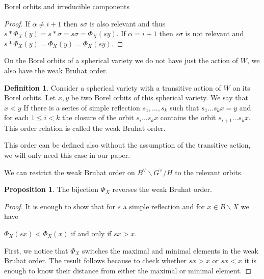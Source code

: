 \documentclass[12pt]{article}
\newcommand{\<}{\langle}
\renewcommand{\>}{\rangle}
\theoremstyle{plain}
\theoremstyle{definition}
\newtheorem{prop}[theorem]{Proposition}
\newtheorem{defn}[theorem]{Definition}
\begin{document}
\begin{section}{Borel orbits and irreducible components}
\begin{proof}
If $\alpha\neq i+1$ then $s\sigma$ is also relevant and thus $s*\Phi_X(y)=s*\sigma=s\sigma=\Phi_X(sy)$. If $\alpha=i+1$ then $s\sigma$ is not relevant and $s*\Phi_X(y)=\Phi_X(y)=\Phi_X(sy)$. 
\end{proof}

On the Borel orbits of a spherical variety we do not have just the action of $W$, we also have the weak Bruhat order. 

\begin{defn}
    Consider a spherical variety with a transitive action of $W$ on its Borel orbits.
    Let $x,y$ be two Borel orbits of this spherical variety. We say that $x<y$ If there is a series of simple reflection $s_1,...,s_k$ such that $s_1...s_kx=y$ and for each $1\leq i< k$ the closure of the orbit $s_i...s_kx$ contains the orbit $s_{i+1}...s_kx$. This order relation is called the weak Bruhat order.

    This order can be defined also without the assumption of the transitive action, we will only need this case in our paper.
\end{defn}


We can restrict the weak Bruhat order on $B^\vee\backslash G^\vee/H$ to the relevant orbits.

\begin{prop}\label{reverse order}
    The bijection $\Phi_X$ reverses the weak Bruhat order. 
\end{prop}

\begin{proof}

It is enough to show that for $s$ a simple reflection and for $x\in B\backslash X$ we have

$\Phi_X(sx)<\Phi_X(x)$ if and only if $sx>x$.

First, we notice that $\Phi_X$ switches the maximal and minimal elements in the weak Bruhat order. The result follows because to check whether $sx>x$ or $sx<x$ it is enough to know their distance from either the maximal or minimal element.

\end{proof}
\end{section}
\end{document}

